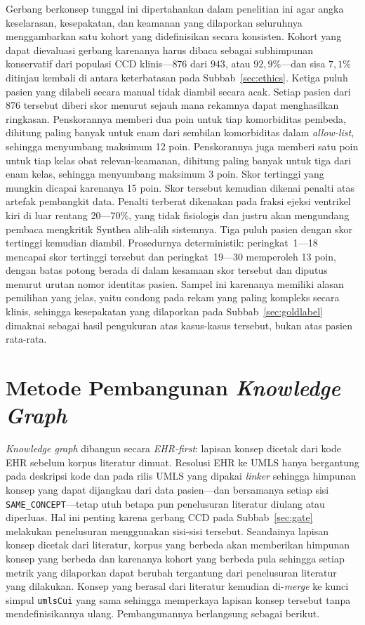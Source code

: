 Gerbang berkonsep tunggal ini dipertahankan dalam penelitian ini agar angka keselarasan,
kesepakatan, dan keamanan yang dilaporkan seluruhnya menggambarkan satu kohort yang
didefinisikan secara konsisten. Kohort yang dapat dievaluasi gerbang karenanya harus dibaca
sebagai subhimpunan konservatif dari populasi CCD klinis---$876$ dari $943$, atau
$92{,}9\%$---dan sisa $7{,}1\%$ ditinjau kembali di antara keterbatasan pada
Subbab~\ref{sec:ethics}.
Ketiga puluh pasien yang dilabeli secara manual tidak diambil secara acak. Setiap pasien
dari 876 tersebut diberi skor menurut sejauh mana rekamnya dapat menghasilkan ringkasan.
Penskorannya memberi dua poin untuk tiap komorbiditas pembeda, dihitung paling banyak
untuk enam dari sembilan komorbiditas dalam \emph{allow-list}, sehingga menyumbang maksimum
12 poin. Penskorannya juga memberi satu poin untuk tiap kelas obat relevan-keamanan,
dihitung paling banyak untuk tiga dari enam kelas, sehingga menyumbang maksimum 3 poin.
Skor tertinggi yang mungkin dicapai karenanya 15 poin. Skor tersebut kemudian dikenai
penalti atas artefak pembangkit data. Penalti terberat dikenakan pada fraksi ejeksi
ventrikel kiri di luar rentang 20---70\%, yang tidak fisiologis dan justru akan mengundang
pembaca mengkritik Synthea alih-alih sistemnya. Tiga puluh pasien dengan skor tertinggi kemudian diambil.
Prosedurnya deterministik: peringkat~1---18 mencapai skor
tertinggi tersebut dan peringkat~19---30 memperoleh 13 poin, dengan batas potong berada di dalam
kesamaan skor tersebut dan diputus menurut urutan nomor identitas pasien. Sampel ini karenanya memiliki
alasan pemilihan yang jelas, yaitu condong pada rekam yang paling kompleks secara klinis, sehingga kesepakatan yang
dilaporkan pada Subbab~\ref{sec:goldlabel} dimaknai sebagai hasil pengukuran atas
kasus-kasus tersebut, bukan atas pasien rata-rata.

\section{Metode Pembangunan \emph{Knowledge Graph}}
\label{sec:kg-construction}

\emph{Knowledge graph} dibangun secara \emph{EHR-first}: lapisan konsep dicetak dari kode EHR
sebelum korpus literatur dimuat. Resolusi EHR ke UMLS hanya bergantung pada deskripsi kode dan
pada rilis UMLS yang dipakai \emph{linker} sehingga himpunan konsep yang dapat dijangkau dari data pasien---dan bersamanya
setiap sisi \texttt{SAME\_CONCEPT}---tetap utuh betapa pun penelusuran literatur diulang atau
diperluas. Hal ini penting karena gerbang CCD pada Subbab~\ref{sec:gate} melakukan penelusuran menggunakan
sisi-sisi tersebut. Seandainya lapisan konsep dicetak dari literatur, korpus yang berbeda akan
memberikan himpunan konsep yang berbeda dan karenanya kohort yang berbeda pula sehingga
setiap metrik yang dilaporkan dapat berubah tergantung dari penelusuran literatur yang dilakukan. Konsep yang
berasal dari literatur kemudian di-\emph{merge} ke kunci simpul \texttt{umlsCui} yang sama
sehingga memperkaya lapisan konsep tersebut tanpa mendefinisikannya ulang. Pembangunannya berlangsung
sebagai berikut.

